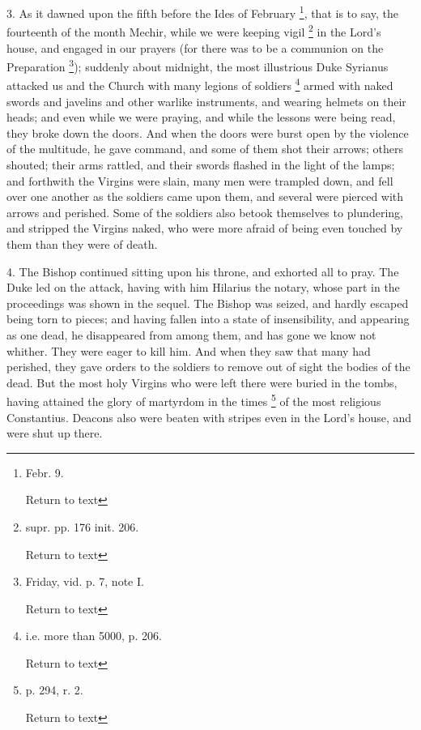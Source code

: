 3. As it dawned upon the fifth before the Ides of
February \footnote{Febr. 9.

Return to text}, that is to say, the fourteenth of the month Mechir,
while we were keeping vigil \footnote{supr. pp. 176 init. 206.

Return to text} in the Lord's house, and engaged in our
prayers (for there was to be a communion on the Preparation \footnote{Friday, vid. p. 7, note I.

Return to text}); suddenly about midnight, the most illustrious Duke Syrianus
attacked us and the Church with many legions of soldiers \footnote{i.e. more than 5000, p. 206.

Return to text}
armed with naked swords and javelins and other warlike instruments,
and wearing helmets on their heads; and even while we were praying,
and while the lessons were being read, they broke down the doors. And
when the doors were burst open by the violence of the multitude, he
gave command, and some of them shot their arrows; others shouted;
their arms rattled, and their swords flashed in the light of the
lamps; and forthwith the Virgins were slain, many men were trampled
down, and fell over one another as the soldiers came upon them, and
several were pierced with arrows and perished. Some of the soldiers
also betook themselves to plundering, and stripped the Virgins naked,
who were more afraid of being even touched by them than they were of
death.

4. The Bishop continued sitting upon his throne,
and exhorted all to pray. The Duke led on the attack, having with him
Hilarius the notary, whose part in the proceedings was shown in the
sequel. The Bishop was seized, and hardly escaped being torn to
pieces; and having fallen into a state of insensibility, and appearing
as one dead, he disappeared from among them, and has gone we know not
whither. They were eager to kill him. And when they saw that many had
perished, they gave orders to the soldiers to remove out of
sight the bodies of the dead. But the most holy Virgins who were left
there were buried in the tombs, having attained the glory of martyrdom
in the times \footnote{p. 294, r. 2.

Return to text} of the most religious Constantius. Deacons also
were beaten with stripes even in the Lord's house, and were shut up
there.


